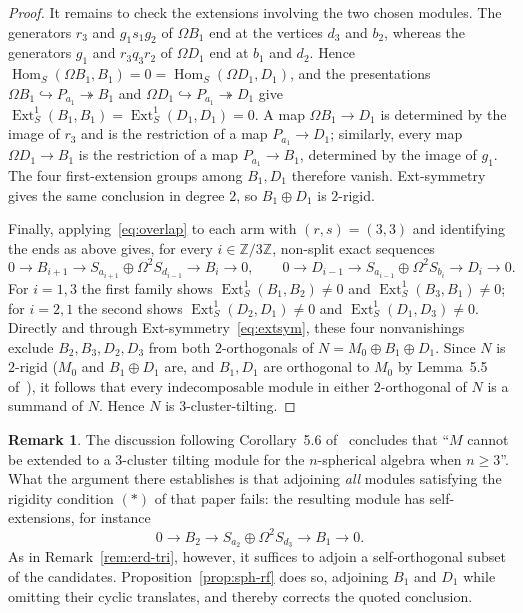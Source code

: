 \documentclass[11pt]{amsart}
\theoremstyle{plain}
\theoremstyle{definition}
\newtheorem{remark}[theorem]{Remark}
\DeclareMathOperator{\Ext}{Ext}
\DeclareMathOperator{\Hom}{Hom}
\newcommand{\ZZ}{\mathbb{Z}}
\begin{document}
\begin{proof}
It remains to check the extensions involving the two chosen modules. The generators $r_3$ and $g_1s_1g_2$ of
$\Omega B_1$ end at the vertices $d_3$ and $b_2$, whereas the generators $g_1$ and $r_3q_3r_2$ of $\Omega D_1$
end at $b_1$ and $d_2$. Hence $\Hom_S(\Omega B_1,B_1)=0=\Hom_S(\Omega D_1,D_1)$, and the presentations $\Omega
B_1\hookrightarrow P_{a_1}\twoheadrightarrow B_1$ and $\Omega D_1\hookrightarrow P_{a_1}\twoheadrightarrow
D_1$ give $\Ext^1_S(B_1,B_1)=\Ext^1_S(D_1,D_1)=0$. A map $\Omega B_1\to D_1$ is determined by the image of
$r_3$ and is the restriction of a map $P_{a_1}\to D_1$; similarly, every map $\Omega D_1\to B_1$ is the
restriction of a map $P_{a_1}\to B_1$, determined by the image of $g_1$. The four first-extension groups among
$B_1,D_1$ therefore vanish. Ext-symmetry gives the same conclusion in degree $2$, so $B_1\oplus D_1$ is
$2$-rigid.

Finally, applying~\eqref{eq:overlap} to each arm with $(r,s)=(3,3)$ and identifying the ends as above gives,
for every $i\in\ZZ/3\ZZ$, non-split exact sequences
\[
 0\longrightarrow B_{i+1}\longrightarrow S_{a_{i+1}}\oplus \Omega^2S_{d_{i-1}}
   \longrightarrow B_i\longrightarrow0,
\qquad
 0\longrightarrow D_{i-1}\longrightarrow S_{a_{i-1}}\oplus \Omega^2S_{b_i}
   \longrightarrow D_i\longrightarrow0.
\]
For $i=1,3$ the first family shows $\Ext^1_S(B_1,B_2)\neq0$ and $\Ext^1_S(B_3,B_1)\neq0$; for $i=2,1$ the
second shows $\Ext^1_S(D_2,D_1)\neq0$ and $\Ext^1_S(D_1,D_3)\neq0$. Directly and through
Ext-symmetry~\eqref{eq:extsym}, these four nonvanishings exclude $B_2,B_3,D_2,D_3$ from both $2$-orthogonals
of $N=M_0\oplus B_1\oplus D_1$. Since $N$ is $2$-rigid ($M_0$ and $B_1\oplus D_1$ are, and $B_1,D_1$ are
orthogonal to $M_0$ by Lemma~5.5 of~\cite{Erdmann}), it follows that every indecomposable module in either
$2$-orthogonal of $N$ is a summand of $N$. Hence $N$ is $3$-cluster-tilting.
\end{proof}

\begin{remark}\label{rem:erd-sph}
The discussion following Corollary~5.6 of~\cite{Erdmann} concludes that ``$M$ cannot be extended to a
$3$-cluster tilting module for the $n$-spherical algebra when $n\ge 3$''. What the argument there establishes
is that adjoining \emph{all} modules satisfying the rigidity condition $(\ast)$ of that paper fails: the
resulting module has self-extensions, for instance
\[
  0\to B_2\to S_{a_2}\oplus \Omega^2S_{d_3}\to B_1\to 0 .
\]
As in Remark~\ref{rem:erd-tri}, however, it suffices to adjoin a self-orthogonal subset of the candidates.
Proposition~\ref{prop:sph-rf} does so, adjoining $B_1$ and $D_1$ while omitting their cyclic translates, and
thereby corrects the quoted conclusion.
\end{remark}
\end{document}
